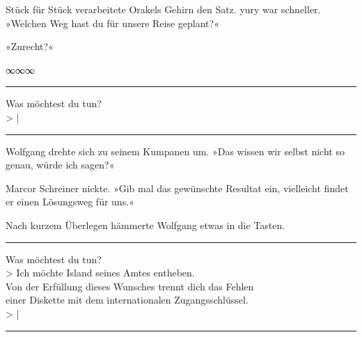 
Stück für Stück verarbeitete Orakels Gehirn den Satz. yury war schneller. »Welchen Weg hast du für unsere Reise geplant?«


»Zurecht?«


\begin{center}
∞∞∞
\end{center}

\noindent \parbox{\textwidth}{ \vspace{3ex} \hrule \vspace{3ex}

    \begin{tiny}
    \begin{ttfamily}

\noindent Was möchtest du tun?\\
\noindent > |


    \end{ttfamily}
    \end{tiny}

\vspace{3ex} \hrule \vspace{3ex} }

Wolfgang drehte sich zu seinem Kumpanen um. »Das wissen wir selbst nicht so genau, würde ich sagen?«

Marcor Schreiner nickte. »Gib mal das gewünschte Resultat ein, vielleicht findet er einen Lösungsweg für uns.«

Nach kurzem Überlegen hämmerte Wolfgang etwas in die Tasten.

\noindent \parbox{\textwidth}{ \vspace{3ex} \hrule \vspace{3ex}

    \begin{tiny}
    \begin{ttfamily}

\noindent Was möchtest du tun?\\
\noindent > Ich möchte Island seines Amtes entheben.\\
\noindent Von der Erfüllung dieses Wunsches trennt dich das Fehlen\\
\noindent einer Diskette mit dem internationalen Zugangsschlüssel.\\
\noindent > |

    \end{ttfamily}
    \end{tiny}

\vspace{3ex} \hrule \vspace{3ex} }

